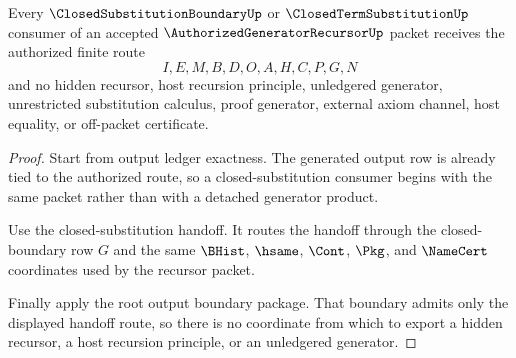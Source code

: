 \begin{theorem}
\label{thm:authorized-generator-recursor-substitution-handoff-nonescape}
Every $\ClosedSubstitutionBoundaryUp$ or $\ClosedTermSubstitutionUp$ consumer of an accepted $\AuthorizedGeneratorRecursorUp$ packet receives the authorized finite route
$$
I,E,M,B,D,O,A,H,C,P,G,N
$$
and no hidden recursor, host recursion principle, unledgered generator, unrestricted substitution calculus, proof generator, external axiom channel, host equality, or off-packet certificate.
\end{theorem}
\begin{proof}
Start from output ledger exactness. The generated output row is already tied to the authorized route, so a closed-substitution consumer begins with the same packet rather than with a detached generator product.

Use the closed-substitution handoff. It routes the handoff through the closed-boundary row $G$ and the same $\BHist$, $\hsame$, $\Cont$, $\Pkg$, and $\NameCert$ coordinates used by the recursor packet.

Finally apply the root output boundary package. That boundary admits only the displayed handoff route, so there is no coordinate from which to export a hidden recursor, a host recursion principle, or an unledgered generator.
\end{proof}

